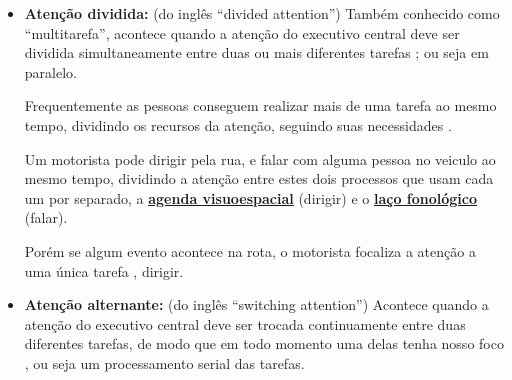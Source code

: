 \begin{itemize}
\item \textbf{Atenção dividida:} (do inglês ``divided attention'') 
Também conhecido como ``multitarefa'', acontece quando a atenção do executivo central deve ser dividida simultaneamente 
entre duas ou mais diferentes tarefas 
\cite[pp. 282]{braisby2012cognitive} \cite[pp. 155, 716]{eysenck2017manual} \cite[pp. 127]{eysenck2017manual};
ou seja em paralelo.

Frequentemente as pessoas conseguem realizar mais de uma tarefa ao mesmo tempo,
dividindo os recursos da atenção, seguindo suas necessidades
\cite[pp. 124]{sternbergpsicologia}.

\begin{example}
\label{ex:motoristadividido}
Um motorista pode dirigir pela rua, e falar com alguma pessoa no veiculo ao mesmo tempo,
dividindo a atenção entre estes dois processos que usam cada um por separado,
a \hyperref[reflabel:visuoespacial]{\textbf{agenda  visuoespacial}} (dirigir)
e o \hyperref[reflabel:fonologico]{\textbf{laço fonológico}} (falar).

Porém se algum evento acontece na rota, o motorista focaliza a atenção a uma única tarefa ,
dirigir.
\end{example}

\item \textbf{Atenção alternante:} (do inglês ``switching attention'')
Acontece quando a atenção do executivo central deve ser trocada continuamente 
entre duas diferentes tarefas, de modo que em todo momento uma delas tenha nosso foco 
\cite[pp. 282]{braisby2012cognitive} \cite[pp. 127]{eysenck2017manual}, 
ou seja um processamento serial das tarefas.
\end{itemize}



